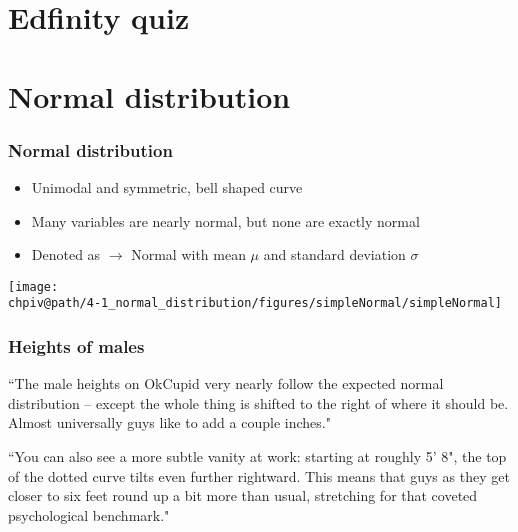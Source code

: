 \documentclass[slidestop,compress,mathserif]{beamer}
\makeatletter
\def\chpiv@path{../../Chp 4}
\makeatother
\begin{document}

\section{Edfinity quiz}



\section{Normal distribution}


\begin{frame}
\frametitle{Normal distribution}

\begin{itemize}

\item Unimodal and symmetric, bell shaped curve

\item Many variables are nearly normal, but none are exactly normal

\item Denoted as  $\rightarrow$ Normal with mean $\mu$ and standard deviation $\sigma$

\end{itemize}

\begin{center}
\texttt{[image: \\chpiv@path/4-1\_normal\_distribution/figures/simpleNormal/simpleNormal]}
\end{center}

\end{frame}


\begin{frame}
\frametitle{Heights of males}

{
\pause
{\footnotesize``The male heights on OkCupid very nearly follow the expected normal distribution -- except the whole thing is shifted to the right of where it should be. Almost universally guys like to add a couple inches." 

``You can also see a more subtle vanity at work: starting at roughly 5' 8", the top of the dotted curve tilts even further rightward. This means that guys as they get closer to six feet round up a bit more than usual, stretching for that coveted psychological benchmark."
}
}


\end{frame}
\end{document}
